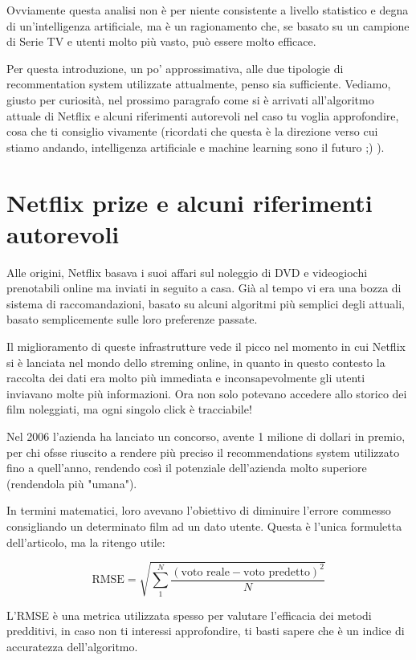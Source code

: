 Ovviamente questa analisi non è per niente consistente a livello statistico e degna di un'intelligenza artificiale, ma è un ragionamento che, se basato su un campione di Serie TV e utenti molto più vasto, può essere molto efficace.

Per questa introduzione, un po' approssimativa, alle due tipologie di recommentation system utilizzate attualmente, penso sia sufficiente. Vediamo, giusto per curiosità, nel prossimo paragrafo come si è arrivati all'algoritmo attuale di Netflix e alcuni riferimenti autorevoli nel caso tu voglia approfondire, cosa che ti consiglio vivamente (ricordati che questa è la direzione verso cui stiamo andando, intelligenza artificiale e machine learning sono il futuro ;) ).

\section{Netflix prize e alcuni riferimenti autorevoli}

Alle origini, Netflix basava i suoi affari sul noleggio di DVD e videogiochi prenotabili online ma inviati in seguito a casa. Già al tempo vi era una bozza di sistema di raccomandazioni, basato su alcuni algoritmi più semplici degli attuali, basato semplicemente sulle loro preferenze passate.

Il miglioramento di queste infrastrutture vede il picco nel momento in cui Netflix si è lanciata nel mondo dello streming online, in quanto in questo contesto la raccolta dei dati era molto più immediata e inconsapevolmente gli utenti inviavano molte più informazioni. Ora non solo potevano accedere allo storico dei film noleggiati, ma ogni singolo click è tracciabile!

Nel 2006 l'azienda ha lanciato un concorso, avente 1 milione di dollari in premio, per chi ofsse riuscito a rendere più preciso il recommendations system utilizzato fino a quell'anno, rendendo così il potenziale dell'azienda molto superiore (rendendola più "umana").

In termini matematici, loro avevano l'obiettivo di diminuire l'errore commesso consigliando un determinato film ad un dato utente. Questa è l'unica formuletta dell'articolo, ma la ritengo utile:

\begin{equation}
\label{eq:RMSE}
\text{RMSE}=\sqrt{\sum_{1}^{N}\frac{(\text{voto reale}-\text{voto predetto})^2}{N}}
\end{equation}

L'RMSE è una metrica utilizzata spesso per valutare l'efficacia dei metodi predditivi, in caso non ti interessi approfondire, ti basti sapere che è un indice di accuratezza dell'algoritmo.


